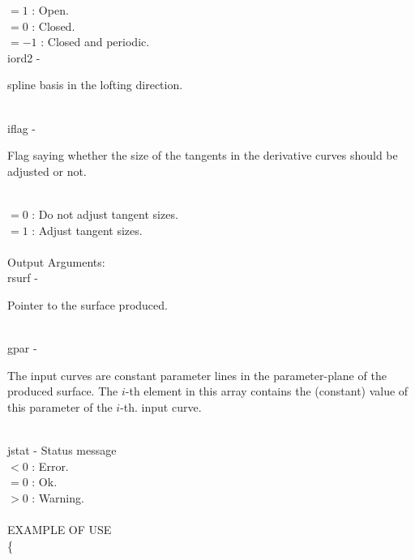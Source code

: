         \>\>\>\>  $= 1$ \> : Open.\\
        \>\>\>\>  $= 0$ \> : Closed.\\
        \>\>\>\>  $= -1$ \> : Closed and periodic.\\
        \>\>    {\fov iord2}\> - \>  \begin{minipg2}
                    spline basis in the
                       lofting direction.
                               \end{minipg2}\\[0.8ex]
        \>\>    {\fov iflag}\> - \>  \begin{minipg2}
                     Flag saying whether the size of the tangents in the
                       derivative curves should be adjusted or not.
                               \end{minipg2}\\
                      \>\>\>\> $= 0$ \> : Do not adjust tangent sizes.\\
                      \>\>\>\> $= 1$ \> : Adjust tangent sizes.\\
\\
	\>Output Arguments:\\
        \>\>    {\fov rsurf}\> - \>  \begin{minipg2}
                     Pointer to the surface produced.
                               \end{minipg2}\\
        \>\>    {\fov gpar}  \> - \>
        \begin{minipg2}
          The input curves are constant parameter lines
          in the parameter-plane of the produced surface.
          The $i$-th element in this array contains the (constant) value
          of this parameter of the $i$-th. input curve.
        \end{minipg2}\\
        \>\>    {\fov jstat} \> - \> Status message\\
                \>\>\>\> $< 0$ \> : Error.\\
                \>\>\>\> $= 0$ \> : Ok.\\
                \>\>\>\> $> 0$ \> : Warning.\\
\\
EXAMPLE OF USE\\
		\>      \{ \\

